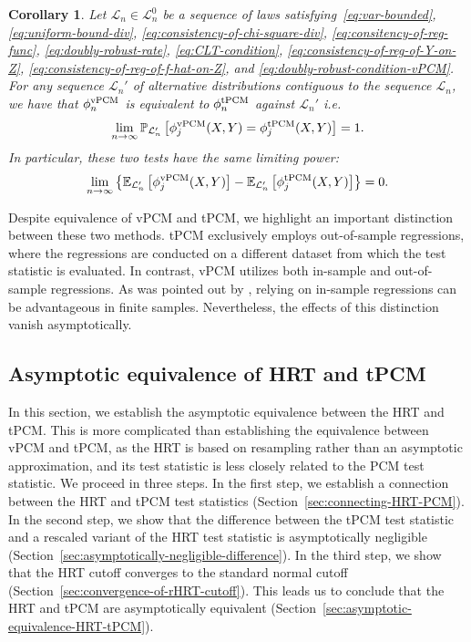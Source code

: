 \documentclass[12pt]{article}
\newtheorem{corollary}{Corollary}
\theoremstyle{definition}
\theoremstyle{remark}
\newcommand{\srx}{X}									%
\newcommand{\sry}{Y}									%
\newcommand{\law}{\mathcal L}							%
\newcommand{\nulllaws}{\mathscr L^0}					%
\begin{document}
\begin{corollary}
	Let $\law_n \in \nulllaws_n$ be a sequence of laws satisfying~\eqref{eq:var-bounded}, \eqref{eq:uniform-bound-div}, \eqref{eq:consistency-of-chi-square-div}, \eqref{eq:consitency-of-reg-func}, \eqref{eq:doubly-robust-rate}, \eqref{eq:CLT-condition}, \eqref{eq:consistency-of-reg-of-Y-on-Z}, \eqref{eq:consistency-of-reg-of-f-hat-on-Z}, and \eqref{eq:doubly-robust-condition-vPCM}. For any sequence $\law_n'$ of alternative distributions contiguous to the sequence $\law_n$, we have that $\phi_n^{\textnormal{vPCM}}$ is equivalent to $\phi_n^{\textnormal{tPCM}}$ against $\law_n'$ i.e.
	$$
	\lim _{n \rightarrow \infty} \mathbb{P}_{\law_n'}\left[\phi_j^{\textnormal{vPCM}}(\srx, \sry)=\phi_j^{\textnormal{tPCM}}(\srx, \sry)\right]=1 .
	$$
	In particular, these two tests have the same limiting power:
	$$
	\lim _{n \rightarrow \infty} \left\{\mathbb{E}_{\law_n'}\left[\phi_j^{\textnormal{vPCM}}(\srx, \sry)\right] - \mathbb{E}_{\law_n'}\left[\phi_j^{\textnormal{tPCM}}(\srx, \sry)\right]\right\} = 0.
	$$
\end{corollary} 	

Despite equivalence of vPCM and tPCM, we highlight an important distinction between these two methods. tPCM exclusively employs out-of-sample regressions, where the regressions are conducted on a different dataset from which the test statistic is evaluated. In contrast, vPCM utilizes both in-sample and out-of-sample regressions. As was pointed out by \citet{Lundborg2022a}, relying on in-sample regressions can be advantageous in finite samples. Nevertheless, the effects of this distinction vanish asymptotically. 

\subsection{Asymptotic equivalence of HRT and tPCM}\label{sec:asymp-equiv-HRT-PCM}
In this section, we establish the asymptotic equivalence between the HRT and tPCM. This is more complicated than establishing the equivalence between vPCM and tPCM, as the HRT is based on resampling rather than an asymptotic approximation, and its test statistic is less closely related to the PCM test statistic. We proceed in three steps. In the first step, we establish a connection between the HRT and tPCM test statistics (Section~\ref{sec:connecting-HRT-PCM}). In the second step, we show that the difference between the tPCM test statistic and a rescaled variant of the HRT test statistic is asymptotically negligible (Section~\ref{sec:asymptotically-negligible-difference}). In the third step, we show that the HRT cutoff converges to the standard normal cutoff (Section~\ref{sec:convergence-of-rHRT-cutoff}). This leads us to conclude that the HRT and tPCM are asymptotically equivalent (Section~\ref{sec:asymptotic-equivalence-HRT-tPCM}).
\end{document}
